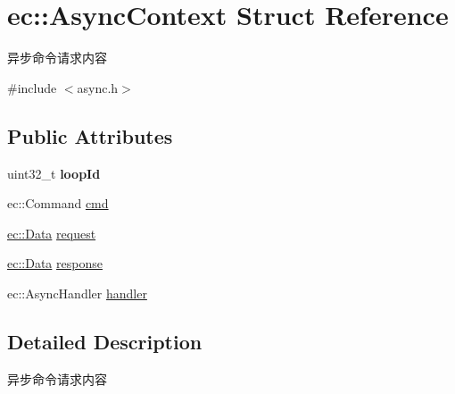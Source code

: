 \hypertarget{structec_1_1AsyncContext}{\section{ec\-:\-:Async\-Context Struct Reference}
\label{structec_1_1AsyncContext}
}


异步命令请求内容  




{\ttfamily \#include $<$async.\-h$>$}

\subsection*{Public Attributes}
\begin{DoxyCompactItemize}
\item 
\hypertarget{structec_1_1AsyncContext_ada31b3197c92c495aa15dd47f0ea5468}{uint32\-\_\-t {\bfseries loop\-Id}}\label{structec_1_1AsyncContext_ada31b3197c92c495aa15dd47f0ea5468}

\item 
ec\-::\-Command \hyperlink{structec_1_1AsyncContext_a8f7efe1fb35eb8dac2a172ac9bf00816}{cmd}
\item 
\hyperlink{classec_1_1Data}{ec\-::\-Data} \hyperlink{structec_1_1AsyncContext_ae2421cc415943bfbe6587336bafed5e4}{request}
\item 
\hyperlink{classec_1_1Data}{ec\-::\-Data} \hyperlink{structec_1_1AsyncContext_a4cba44af18997a45d803e4d2533bc303}{response}
\item 
ec\-::\-Async\-Handler \hyperlink{structec_1_1AsyncContext_abda01a357a1b54062f5369c5a359a489}{handler}
\end{DoxyCompactItemize}


\subsection{Detailed Description}
异步命令请求内容 

